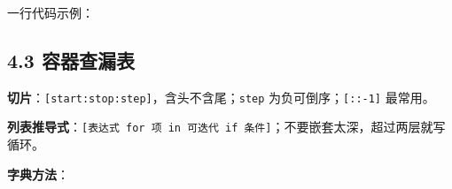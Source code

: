 一行代码示例：

\begin{Shaded}
\begin{Highlighting}[]
\OperatorTok{=}\NormalTok{ [}\NormalTok{, }\NormalTok{, }\NormalTok{, }\NormalTok{, }\NormalTok{, }\NormalTok{, }\NormalTok{, }\NormalTok{]}
\NormalTok{(nums[}\NormalTok{:}\NormalTok{])            }\CommentTok{\# [1, 4, 1, 5]}
\NormalTok{(nums[::}\OperatorTok{{-}}\NormalTok{])           }
\NormalTok{(}
\NormalTok{(}\NormalTok{(}
\OperatorTok{*}\NormalTok{ nums[:}\NormalTok{]\})}
\end{Highlighting}
\end{Shaded}

\subsection{4.3 容器查漏表}\label{ux5bb9ux5668ux67e5ux6f0fux8868}

\textbf{切片}：\texttt{{[}start:stop:step{]}}，含头不含尾；\texttt{step}
为负可倒序；\texttt{{[}::-1{]}} 最常用。

\textbf{列表推导式}：\texttt{{[}表达式\ for\ 项\ in\ 可迭代\ if\ 条件{]}}；不要嵌套太深，超过两层就写循环。

\textbf{字典方法}：

\begin{Shaded}
\begin{Highlighting}[]
\OperatorTok{=}\NormalTok{ \{}\NormalTok{: }\NormalTok{, }\NormalTok{: }\NormalTok{\}}
\NormalTok{, }\NormalTok{))        }
\end{Highlighting}
\end{Shaded}

